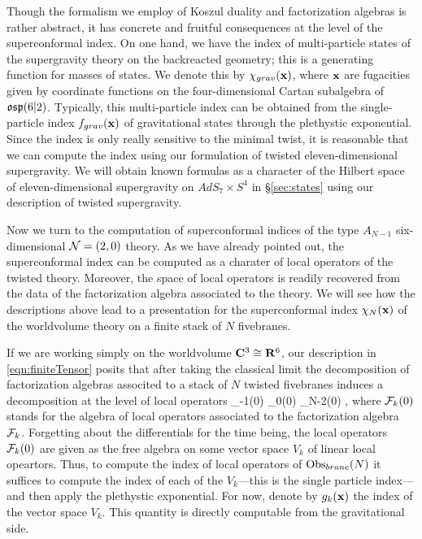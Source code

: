 Though the formalism we employ of Koszul duality and factorization algebras is rather abstract, it has concrete and fruitful consequences at the level of the superconformal index.
On one hand, we have the index of multi-particle states of the supergravity theory on the backreacted geometry; this is a generating function for masses of states. We denote this by $\chi_{grav}({\bf x})$, where ${\bf x}$ are fugacities given by coordinate functions on the four-dimensional Cartan subalgebra of~$\mathfrak{osp}(6|2)$.
Typically, this multi-particle index can be obtained from the single-particle index $f_{grav}({\bf x})$ of gravitational states through the plethystic exponential. 
Since the index is only really sensitive to the minimal twist, it is reasonable that we can compute the index using our formulation of twisted eleven-dimensional supergravity.
We will obtain known formulas as a character of the Hilbert space of eleven-dimensional supergravity on $AdS_7\times S^{4}$ in \S\ref{sec:states} using our description of twisted supergravity.

Now we turn to the computation of superconformal indices of the type $A_{N-1}$ six-dimensional $\mathcal N=(2,0)$ theory. As we have already pointed out, the superconformal index can be computed as a charater of local operators of the twisted theory. Moreover, the space of local operators is readily recovered from the data of the factorization algebra associated to the theory. We will see how the descriptions above lead to a presentation for the superconformal index $\chi_N({\bf x})$ of the worldvolume theory on a finite stack of $N$ fivebranes.

If we are working simply on the worldvolume $\mathbf{C}^3 \cong \mathbf{R}^6$, our description in \eqref{eqn:finiteTensor} posits that after taking the classical limit the decomposition of factorization algebras associted to a stack of $N$ twisted fivebranes induces a decomposition at the level of local operators
\beqn
\cF_{-1}(0) \otimes \cF_0(0) \otimes \cdots \otimes \cF_{N-2}(0) ,
\eeqn
where $\mathcal F_k(0)$ stands for the algebra of local operators associated to the factorization algebra $\mathcal F_k$.
Forgetting about the differentials for the time being, the local operators $\mathcal F_k(0)$ are given as the free algebra on some vector space $V_k$ of linear local opeartors.
Thus, to compute the index of local operators of $\operatorname{Obs}_{brane}(N)$ it suffices to compute the index of each of the $V_k$---this is the single particle index---and then apply the plethystic exponential.
For now, denote by $g_k({\bf x})$ the index of the vector space $V_k$.
This quantity is directly computable from the gravitational side.

